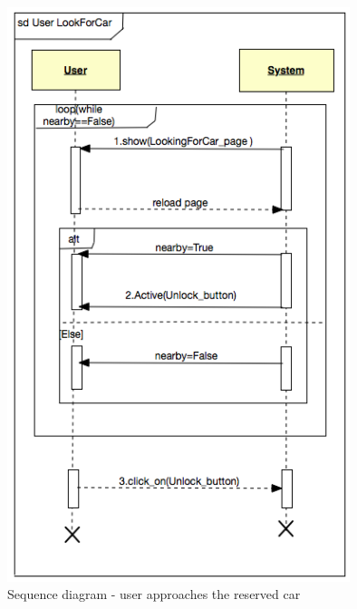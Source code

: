 \documentclass[12pt, letterpaper]{article}
\begin{document}
\begin{figure}[H]
\centering
\includegraphics[width=10cm]{userclose.png}
\caption{Sequence diagram - user approaches the reserved car}
\end{figure}
\end{document}
